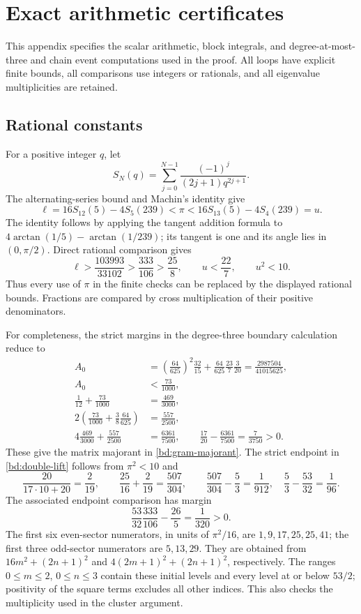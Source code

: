 \documentclass[11pt,reqno]{amsart}
\numberwithin{equation}{section}
\begin{document}
\appendix

\section{Exact arithmetic certificates}
\label{app:certificates}

This appendix specifies the scalar arithmetic, block integrals, and
degree-at-most-three and chain event computations used in the proof. All
loops have explicit finite bounds, all comparisons use integers or
rationals, and all eigenvalue multiplicities are retained.

\subsection{Rational constants}

For a positive integer $q$, let
\[
 S_N(q)=\sum_{j=0}^{N-1}\frac{(-1)^j}{(2j+1)q^{2j+1}}.
\]
The alternating-series bound and Machin's identity give
\[
 \ell=16S_{12}(5)-4S_5(239)<\pi
 <16S_{13}(5)-4S_4(239)=u.
\]
The identity follows by applying the tangent addition formula to
$4\arctan(1/5)-\arctan(1/239)$; its tangent is one and its angle lies
in $(0,\pi/2)$. Direct rational comparison gives
\begin{equation}
 \ell>\frac{103993}{33102}>\frac{333}{106}>\frac{25}{8},
 \qquad u<\frac{22}{7},\qquad u^2<10.
 \label{app:pi-bounds}
\end{equation}
Thus every use of $\pi$ in the finite checks can be replaced by the
displayed rational bounds. Fractions are compared by cross multiplication
of their positive denominators.

For completeness, the strict margins in the degree-three boundary
calculation reduce to
\[
 \begin{split}
 A_0&=\left(\frac{64}{625}\right)^2\frac{32}{15}
       +\frac{64}{625}\frac{23}{7}\frac3{20}
       =\frac{2987504}{41015625},\\
 A_0&<\frac{73}{1000},\\
 \frac1{12}+\frac{73}{1000}&=\frac{469}{3000},\\
 2\left(\frac{73}{1000}+\frac38\frac{64}{625}\right)
 &=\frac{557}{2500},\\
 4\frac{469}{3000}+\frac{557}{2500}
 &=\frac{6361}{7500},\qquad
 \frac{17}{20}-\frac{6361}{7500}=\frac7{3750}>0.
 \end{split}
\]
These give the matrix majorant in \eqref{bd:gram-majorant}. The strict
endpoint in \eqref{bd:double-lift} follows from $\pi^2<10$ and
\[
 \frac{20}{17\cdot10+20}=\frac2{19},\qquad
 \frac{25}{16}+\frac2{19}=\frac{507}{304},\qquad
 \frac{507}{304}-\frac53=\frac1{912},\quad
 \frac53-\frac{53}{32}=\frac1{96}.
\]
The associated endpoint comparison has margin
\[
 \frac{53}{32}\frac{333}{106}-\frac{26}{5}=\frac1{320}>0.
\]
The first six even-sector numerators, in units of $\pi^2/16$, are
$1,9,17,25,25,41$; the first three odd-sector numerators are $5,13,29$.
They are obtained from
$16m^2+(2n+1)^2$ and $4(2m+1)^2+(2n+1)^2$, respectively. The ranges
$0\le m\le2$, $0\le n\le3$ contain these initial levels and every
level at or below $53/2$; positivity of the square terms excludes all
other indices. This also checks the multiplicity used in the cluster
argument.
\end{document}
